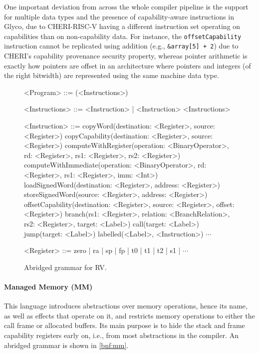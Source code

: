 \documentclass[main.tex]{subfiles}
\begin{document}
One important deviation from \cite{compcourse} across the whole compiler pipeline is the support for multiple data types and the presence of capability-aware instructions in Glyco, due to CHERI-RISC-V having a different instruction set operating on capabilities than on non-capability data. For instance, the \texttt{offsetCapability} instruction cannot be replicated using addition (e.g., \texttt{\&array[5] + 2}) due to CHERI's capability provenance security property, whereas pointer arithmetic is exactly how pointers are offset in an architecture where pointers and integers (of the right bitwidth) are represented using the same machine data type.

\begin{figure}[ht]
	\small
	\begin{grammar}
		
		<Program> ::= (<Instructions>)
		
		<Instructions> ::= <Instruction> | <Instruction> <Instructions>
		
		<Instruction> ::= copyWord(destination: <Register>, source: <Register>)
			\alt copyCapability(destination: <Register>, source: <Register>)
			\alt computeWithRegister(operation: <BinaryOperator>, rd: <Register>, rs1: <Register>, rs2: <Register>)
			\alt computeWithImmediate(operation: <BinaryOperator>, rd: <Register>, rs1: <Register>, imm: <Int>)
			\alt loadSignedWord(destination: <Register>, address: <Register>)
			\alt storeSignedWord(source: <Register>, address: <Register>)
			\alt offsetCapability(destination: <Register>, source: <Register>, offset: <Register>)
			\alt branch(rs1: <Register>, relation: <BranchRelation>, rs2: <Register>, target: <Label>)
			\alt call(target: <Label>)
			\alt jump(target: <Label>)
			\alt labelled(<Label>, <Instruction>)
			\alt $\cdots$
			
		<Register> ::= zero | ra | sp | fp | t0 | t1 | t2 | s1 | $\cdots$
		
	\end{grammar}
	\caption{Abridged grammar for RV.}
	\label{bnf:rv}
\end{figure}

\paragraph{Managed Memory (MM)} This language introduces abstractions over memory operations, hence its name, as well as effects that operate on it, and restricts memory operations to either the call frame or allocated buffers. Its main purpose is to hide the stack and frame capability registers early on, i.e., from most abstractions in the compiler. An abridged grammar is shown in \cref{bnf:mm}.
\end{document}
